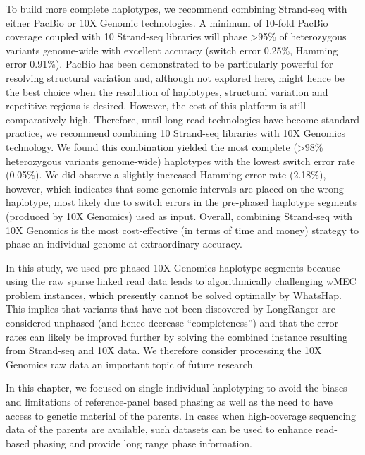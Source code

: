 	To build more complete haplotypes, we recommend combining Strand-seq with either PacBio or 10X Genomic technologies. A minimum of 10-fold PacBio coverage coupled with 10 Strand-seq 
	libraries will phase >95\% of heterozygous variants genome-wide with excellent accuracy (switch error 0.25\%, Hamming error 0.91\%). 
	PacBio has been demonstrated to be particularly powerful for resolving structural variation \citep{huddleston2017discovery, chaisson2015genetic} and, 
	although not explored here, might hence be the best choice when the resolution of haplotypes, structural variation and repetitive regions is desired. 
	However, the cost of this platform is still comparatively high. Therefore, until long-read technologies have become standard practice, we recommend combining 10 Strand-seq 
	libraries with 10X Genomics technology. We found this combination yielded the most complete (>98\% heterozygous variants genome-wide) haplotypes with the lowest switch error rate (0.05\%). 
	We did observe a slightly increased Hamming error rate (2.18\%), however, which indicates that some genomic intervals are placed on the wrong haplotype, most likely due to switch errors 
	in the pre-phased haplotype segments (produced by 10X Genomics) used as input. Overall, combining Strand-seq with 10X Genomics is the most cost-effective (in terms of time and money) strategy to phase an individual genome at extraordinary accuracy.

	
	In this study, we used pre-phased 10X Genomics haplotype segments because using the raw sparse linked read data leads to algorithmically challenging wMEC problem instances, 
	which presently cannot be solved optimally by WhatsHap. This implies that variants that have not been discovered by LongRanger are considered unphased (and hence decrease “completeness”) 
	and that the error rates can likely be improved further by solving the combined instance resulting from Strand-seq and 10X data. We therefore consider processing the 10X Genomics raw data an important topic of future research.

	In this chapter, we focused on single individual haplotyping to avoid the biases and limitations of reference-panel based phasing as well as the need to have access to genetic material of the parents. 
        In cases when high-coverage sequencing data of the parents are available, such datasets can be used to enhance read-based phasing and provide long range 
	phase information. 
	
